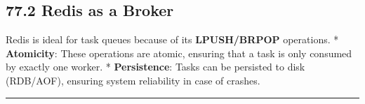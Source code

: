 \hypertarget{redis-as-a-broker}{%
\subsection{77.2 Redis as a Broker}\label{redis-as-a-broker}}

Redis is ideal for task queues because of its \textbf{LPUSH/BRPOP}
operations. * \textbf{Atomicity}: These operations are atomic, ensuring
that a task is only consumed by exactly one worker. *
\textbf{Persistence}: Tasks can be persisted to disk (RDB/AOF), ensuring
system reliability in case of crashes.

\begin{center}\rule{0.5\linewidth}{0.5pt}\end{center}
